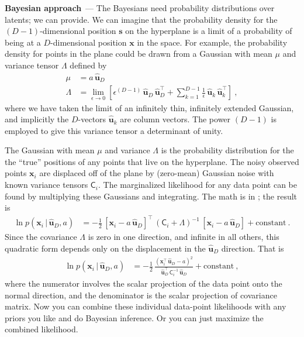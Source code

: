 \documentclass{article}
\renewcommand{\paragraph}[1]{\bigskip\par\noindent\textbf{#1}~---}
\renewcommand{\vec}[1]{\bm{#1}}
\newcommand{\mat}[1]{\mathsf{#1}}
\newcommand{\given}{\,|\,}
\begin{document}
\paragraph{Bayesian approach}
The Bayesians need probability distributions over latents; we can provide.
We can imagine that the probability density for the $(D-1)$-dimensional position $\vec{s}$ on the hyperplane is a limit of a probability of being at a $D$-dimensional position $\vec{x}$ in the space.
For example, the probability density for points in the plane could be drawn from a Gaussian with mean $\mu$ and variance tensor $\mat{\Lambda}$ defined by
\begin{align}
    \mu &= a\,\vec{\hat{u}}_D \\
    \mat{\Lambda} &= \lim_{\epsilon\rightarrow 0}\left[ \epsilon^{(D-1)}\,\vec{\hat{u}}_D\,\vec{\hat{u}}_D^\top + \sum_{k=1}^{D-1} \frac{1}{\epsilon}\,\vec{\hat{u}}_k\,\vec{\hat{u}}_k^\top\right] ~,
\end{align}
where we have taken the limit of an infinitely thin, infinitely extended Gaussian, and implicitly the $D$-vectors $\vec{\hat{u}}_k$ are column vectors.
The power $(D-1)$ is employed to give this variance tensor a determinant of unity.

The Gaussian with mean $\mu$ and variance $\mat{\Lambda}$ is the probability distribution for the the ``true'' positions of any points that live on the hyperplane.
The noisy observed points $\vec{x}_i$ are displaced off of the plane by (zero-mean) Gaussian noise with known variance tensors $\mat{C}_i$.
The marginalized likelihood for any data point can be found by multiplying these Gaussians and integrating.
The math is in \cite{HPWL}; the result is
\begin{align}
    \ln p(\vec{x}_i\given \vec{\hat{u}}_D,a) &= -\frac{1}{2}\,[\vec{x}_i - a\,\vec{\hat{u}}_D]^\top\,(\mat{C}_i + \mat{\Lambda})^{-1}\,[\vec{x}_i - a\,\vec{\hat{u}}_D] + \text{constant} ~.
\end{align}
Since the covariance $\mat{\Lambda}$ is zero in one direction, and infinite in all others, this quadratic form depends only on the displacement in the $\vec{\hat{u}}_D$ direction.
That is
\begin{align}
    \ln p(\vec{x}_i\given \vec{\hat{u}}_D,a) &= -\frac{1}{2}\,\frac{(\vec{x}_i^\top\,\vec{\hat{u}}_D - a)^2}{\vec{\hat{u}}_D^\top\,\mat{C}_i^{-1}\,\vec{\hat{u}}_D} + \text{constant} ~,
\end{align}
where the numerator involves the scalar projection of the data point onto the normal direction, and the denominator is the scalar projection of covariance matrix.
Now you can combine these individual data-point likelihoods with any priors you like and do Bayesian inference.
Or you can just maximize the combined likelihood.
\end{document}
